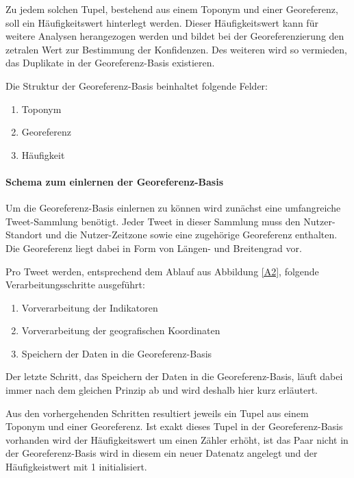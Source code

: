 						Zu jedem solchen Tupel, bestehend aus einem Toponym und einer Georeferenz, soll ein Häufigkeitswert hinterlegt werden.
						Dieser Häufigkeitswert kann für weitere Analysen herangezogen werden und bildet bei der Georeferenzierung den zetralen Wert zur Bestimmung der Konfidenzen. 
						Des weiteren wird so vermieden, das Duplikate in der Georeferenz-Basis existieren.

						Die Struktur der Georeferenz-Basis beinhaltet folgende Felder:

						\begin{enumerate}
							\item Toponym
							\item Georeferenz  
							\item Häufigkeit 
						\end{enumerate}


					\paragraph{Schema zum einlernen der Georeferenz-Basis}

					Um die Georeferenz-Basis einlernen zu können wird zunächst eine umfangreiche Tweet-Sammlung benötigt.
					Jeder Tweet in dieser Sammlung muss den Nutzer-Standort und die Nutzer-Zeitzone sowie eine zugehörige Georeferenz enthalten.
					Die Georeferenz liegt dabei in Form von Längen- und Breitengrad vor. 
					
					Pro Tweet werden, entsprechend dem Ablauf aus Abbildung \ref{A2}, folgende Verarbeitungsschritte ausgeführt:

					\begin{enumerate}
						\item Vorverarbeitung der Indikatoren
						\item Vorverarbeitung der geografischen Koordinaten
						\item Speichern der Daten in die Georeferenz-Basis
					\end{enumerate}

					Der letzte Schritt, das Speichern der Daten in die Georeferenz-Basis, läuft dabei immer nach dem gleichen Prinzip ab und wird deshalb hier kurz erläutert.
					
					Aus den vorhergehenden Schritten resultiert jeweils ein Tupel aus einem Toponym und einer Georeferenz. 
					Ist exakt dieses Tupel in der Georeferenz-Basis vorhanden wird der Häufigkeitswert um einen Zähler erhöht, ist das Paar nicht in der Georeferenz-Basis wird in diesem ein neuer Datenatz angelegt und der Häufigkeistwert mit 1 initialisiert.

